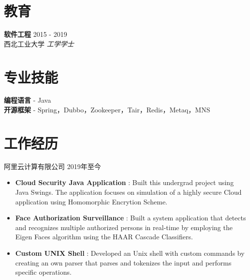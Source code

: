 \documentclass[margin, centered]{res}
\begin{document}
    \begin{resume}

        \section{教育}
        \textbf{软件工程} \hfill 2015 - 2019 \\
        { 西北工业大学 \textit{工学学士} }


        \section{专业技能}

        \textbf{编程语言} - Java \\
        \textbf{开源框架} - Spring，Dubbo，Zookeeper，Tair，Redis，Metaq，MNS


        \section{工作经历}
        阿里云计算有限公司  \hfill 2019年至今
        \\
        \begin{itemize}[leftmargin=*]


            \item \textbf{{Cloud Security Java Application }}: Built this undergrad project using Java Swings. The application focuses on simulation of a highly secure Cloud application using Homomorphic Encrytion Scheme.

            \item \textbf{{Face Authorization Surveillance }} : Built a system application that detects and recognizes
            multiple authorized persons in real-time by employing the Eigen Faces algorithm using the HAAR Cascade Classifiers.

            \item \textbf{{Custom UNIX Shell}} : Developed an Unix shell with custom commands by creating an own parser that parses and tokenizes the input and performs specific operations.


\end{itemize}
\end{resume}
\end{document}
